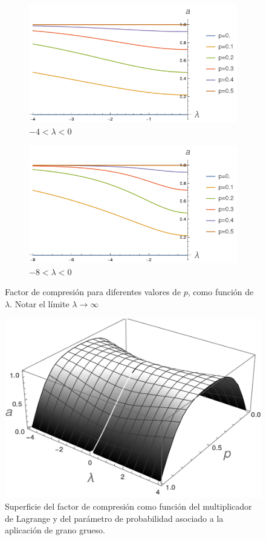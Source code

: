 \begin{figure}[h!]
\centering
\begin{subfigure}{0.475\textwidth}
  \centering
  \includegraphics[width=0.6\linewidth]{maxent/figures/ContractionFactorSWAP_2D_lambda-4to0.png}
  \caption{$-4<\lambda<0$}
\end{subfigure}%
\begin{subfigure}{0.475\textwidth}
  \centering
  \includegraphics[width=0.6\linewidth]{maxent/figures/ContractionFactorSWAP_2D_lambda-8to0.png}
  \caption{$-8<\lambda<0$}
\end{subfigure}
\caption{Factor de compresión para diferentes valores de $p$, como función de $\lambda$. Notar el límite $\lambda\rightarrow \infty$}
\label{fig:SWAPFactorP}
\end{figure}
\begin{figure}[h!]
\centering
\includegraphics[width=0.6\linewidth]{maxent/figures/ContractionFactorSWAP_3D_lambda-4to4.png}
\caption{Superficie del factor de compresión como función del multiplicador de Lagrange y del parámetro de probabilidad asociado a la aplicación de grano grueso. }
\label{fig:SWAPFactorSup}
\end{figure}
